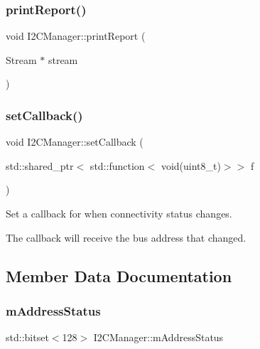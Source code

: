 \subsubsection{\texorpdfstring{print\+Report()}{printReport()}}
{\footnotesize\ttfamily void I2\+C\+Manager\+::print\+Report (\begin{DoxyParamCaption}\item[{Stream $\ast$}]{stream }\end{DoxyParamCaption})}

\mbox{\label{class_i2_c_manager_a1e027a9de421a28a606dedd366858bd8}} 
\subsubsection{\texorpdfstring{set\+Callback()}{setCallback()}}
{\footnotesize\ttfamily void I2\+C\+Manager\+::set\+Callback (\begin{DoxyParamCaption}\item[{std\+::shared\+\_\+ptr$<$ std\+::function$<$ void(uint8\+\_\+t)$>$$>$}]{f }\end{DoxyParamCaption})}



Set a callback for when connectivity status changes. 

The callback will receive the bus address that changed. 

\subsection{Member Data Documentation}
\mbox{\label{class_i2_c_manager_a82811d5e2ea4a92fa7c6016c9411b9a8}} 
\subsubsection{\texorpdfstring{m\+Address\+Status}{mAddressStatus}}
{\footnotesize\ttfamily std\+::bitset$<$128$>$ I2\+C\+Manager\+::m\+Address\+Status\hspace{0.3cm}{\ttfamily [private]}}

\mbox{\label{class_i2_c_manager_ac98624d02c284e76f93179b2bb3d699e}} 
